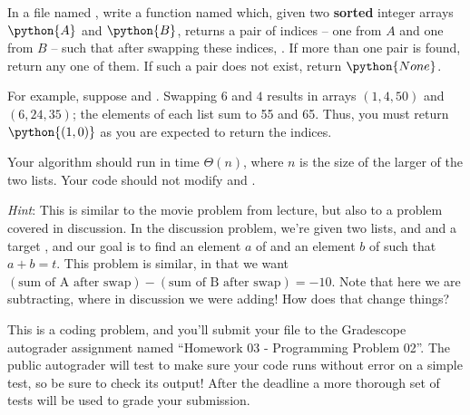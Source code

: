 \begin{progprob}
    In a file named , write a function named
     which, given two \textbf{sorted} integer arrays
    $\python{A}$ and $\python{B}$, returns a pair of indices  -- one from $A$ and one from $B$ -- such that after swapping these
    indices, . If more than one pair is found,
    return any one of them. If such a pair does not exist, return
    $\python{None}$. 

    For example, suppose  and .
    Swapping $6$ and $4$ results in arrays $(1, 4, 50)$ and $(6, 24, 35)$; the
    elements of each list sum to 55 and 65. Thus, you must return $\python{(1,
    0)}$ as you are expected to return the indices. 

    Your algorithm should run in time $\Theta(n)$, where $n$ is the size of the
    larger of the two lists. Your code should not modify  and .

    \emph{Hint}: This is similar to the movie problem from lecture, but also to
    a problem covered in discussion. In the discussion problem,
    we're given two lists,  and  and a target ,
    and our goal is to find an element $a$ of  and an element $b$ of
     such that $a + b = t$. This problem is similar, in that we want
    $(\text{sum of A after swap}) - (\text{sum of B after swap}) = -10$. Note
    that here we are subtracting, where in discussion we were adding! How does
    that change things?

    This is a coding problem, and you'll submit your 
    file to the Gradescope autograder assignment named ``Homework 03 -
    Programming Problem 02''. The public autograder will test to make sure your
    code runs without error on a simple test, so be sure to check its output!
    After the deadline a more thorough set of tests will be used to grade your
    submission.

    \begin{soln}

        \inputminted{python}{\thisdir/include-solution/swap_sum.py}

    \end{soln}
\end{progprob}
